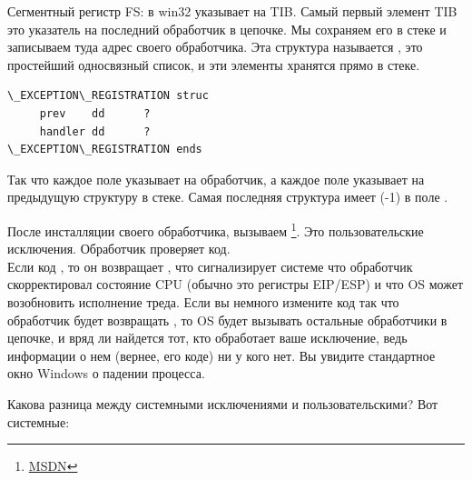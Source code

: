 

Сегментный регистр FS: в win32 указывает на \ac{TIB}.
Самый первый элемент \ac{TIB} это указатель на последний обработчик в цепочке.
Мы сохраняем его в стеке и записываем туда адрес своего обработчика.
Эта структура называется , 
это простейший односвязный список, и эти элементы хранятся прямо в стеке.

\begin{lstlisting}[caption=MSVC/VC/crt/src/exsup.inc]
\_EXCEPTION\_REGISTRATION struc
     prev    dd      ?
     handler dd      ?
\_EXCEPTION\_REGISTRATION ends
\end{lstlisting}

Так что каждое поле  указывает на обработчик,
а каждое поле  указывает на предыдущую структуру в стеке.
Самая последняя структура имеет  (-1) в поле .



После инсталляции своего обработчика, вызываем \footnote{\href{http://go.yurichev.com/17253}{MSDN}}.
Это пользовательские исключения. 
Обработчик проверяет код.\\
Если код , то он возвращает ,
что сигнализирует системе что обработчик скорректировал состояние CPU (обычно это регистры EIP/ESP) и что \ac{OS} может
возобновить исполнение треда.
Если вы немного измените код так что обработчик будет возвращать ,
то \ac{OS} будет вызывать остальные
обработчики в цепочке, и вряд ли найдется тот, кто обработает ваше исключение,
ведь информации о нем (вернее, его коде) ни у кого нет.
Вы увидите стандартное окно Windows о падении процесса.

Какова разница между системными исключениями и пользовательскими? Вот системные:

